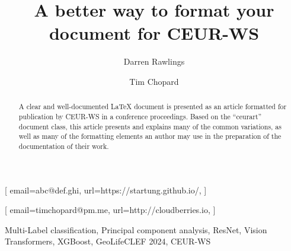 


\title{A better way to format your document for CEUR-WS}

\author[1]{Darren Rawlings}[%
email=abc@def.ghi,
url=https://startung.github.io/,
]
\address[1]{University of Groningen, Broerstraat 5, 9712 CP Groningen, Netherlands}

\author[]{Tim Chopard}[%
email=timchopard@pm.me,
url=http://cloudberries.io,
]


\begin{abstract}
  A clear and well-documented \LaTeX{} document is presented as an
  article formatted for publication by CEUR-WS in a conference
  proceedings. Based on the ``ceurart'' document class, this article
  presents and explains many of the common variations, as well as many
  of the formatting elements an author may use in the preparation of
  the documentation of their work.
\end{abstract}

\begin{keywords}
  Multi-Label classification\sep
  Principal component analysis\sep
  ResNet\sep
  Vision Transformers\sep
  XGBoost\sep
  GeoLifeCLEF 2024\sep
  CEUR-WS
\end{keywords}

\maketitle